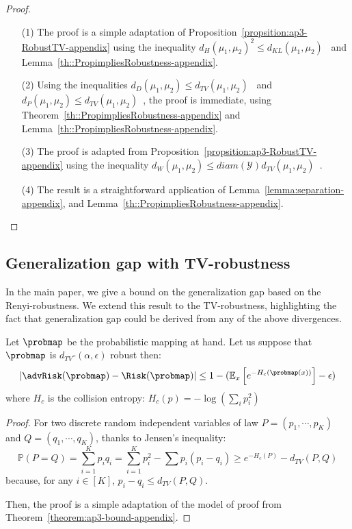 \begin{proof}
\begin{itemize}
\item[ ]
\item[(1)] The proof is a simple adaptation of Proposition~\ref{propsition:ap3-RobustTV-appendix} using the inequality $d_H(\mu_1,\mu_2)^{2} \leq d_{KL}(\mu_1,\mu_2)$~\cite{AGibbsMetrics2002} and Lemma~\ref{th::PropimpliesRobustness-appendix}.\\
\item[(2)] Using the inequalities  $d_D(\mu_1,\mu_2) \leq d_{TV}(\mu_1,\mu_2)$~\cite{AGibbsMetrics2002} and  $d_P(\mu_1,\mu_2) \leq d_{TV}(\mu_1,\mu_2)$~\cite{huber2011robust}, the proof is immediate, using Theorem~\ref{th::PropimpliesRobustness-appendix} and Lemma~\ref{th::PropimpliesRobustness-appendix}.
\item[(3)] The proof is adapted from Proposition~\ref{propsition:ap3-RobustTV-appendix} using the inequality $d_W(\mu_1,\mu_2) \leq diam(\mathcal{Y}) d_{TV}(\mu_1,\mu_2)$~\cite{AGibbsMetrics2002}.
\item[(4)]The result is a straightforward application of Lemma~\ref{lemma:separation-appendix}, and Lemma~\ref{th::PropimpliesRobustness-appendix}.
\end{itemize}
\end{proof}


\subsection{Generalization gap with TV-robustness}

In the main paper, we give a bound on the generalization gap based on the Renyi-robustness. We extend this result to the TV-robustness, highlighting the fact that generalization gap could be derived from any of the above divergences.

\begin{theorem}

\label{theorem:ap3-boundTV-appendix}
Let $\probmap$ be the probabilistic mapping at hand. Let us suppose that  $\probmap$ is $d_{TV}$-$(\alpha,\epsilon)$ robust then:
$$|\advRisk(\probmap)-\Risk(\probmap)|\leq 1-(\mathbb{E}_x\left[e^{-H_c(\probmap(x))}\right]-\epsilon)$$
where $H_c$ is the collision entropy: $H_c(p)=-\log(\sum_i p_i^2)$
\end{theorem}
\begin{proof}
For two discrete random independent variables of law $P=(p_1, \cdots ,p_K)$ and $Q=(q_1, \cdots ,q_K)$, thanks to Jensen's inequality: 
$$\mathbb{P}(P=Q)=\sum_{i=1}^K p_i q_i=\sum_{i=1}^K p_i^2-\sum p_i(p_i-q_i)\geq e^{-H_c(P)}-d_{TV}(P,Q)$$
because, for any $i \in [K]$, $p_i-q_i\leq d_{TV}(P,Q)$.

Then, the proof is a simple adaptation of the model of proof from Theorem~\ref{theorem:ap3-bound-appendix}.
\end{proof}


